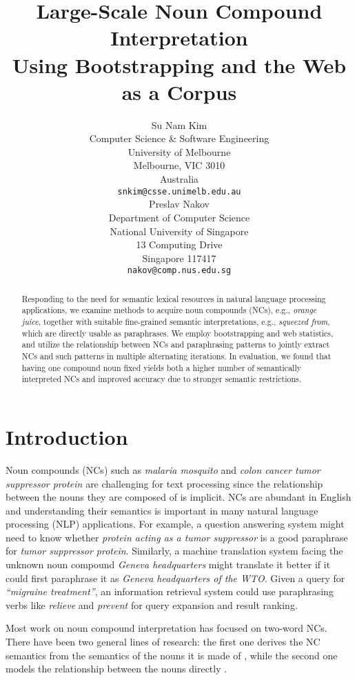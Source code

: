 \documentclass[letterpaper,11pt]{article}
\title{Large-Scale Noun Compound Interpretation \\
       Using Bootstrapping and the Web as a Corpus}
\author{Su Nam Kim \\
  Computer Science \& Software Engineering \\
  University of Melbourne\\
  Melbourne, VIC 3010\\
  Australia\\
  {\tt snkim@csse.unimelb.edu.au} \\\And
  Preslav Nakov\\
  Department of Computer Science\\
  National University of Singapore\\
  13 Computing Drive\\
  Singapore 117417\\
  {\tt nakov@comp.nus.edu.sg} \\}
\date{}
\begin{document}
\maketitle


\begin{abstract}

Responding  to the  need  for semantic  lexical  resources in  natural
language processing  applications, we examine methods  to acquire noun
compounds  (NCs), e.g.,  \emph{orange juice},  together with  suitable
fine-grained  semantic  interpretations, e.g.,  \emph{squeezed  from},
which  are directly  usable  as paraphrases.  We employ  bootstrapping
and  web statistics,  and  utilize the  relationship  between NCs  and
paraphrasing  patterns to  jointly extract  NCs and  such patterns  in
multiple alternating  iterations. In evaluation, we  found that having
one compound  noun fixed yields  both a higher number  of semantically
interpreted  NCs  and  improved  accuracy  due  to  stronger  semantic
restrictions.

\end{abstract}

\section{Introduction}
\label{sec:introduction}


Noun compounds (NCs) such as \emph{malaria mosquito} and \textit{colon
cancer tumor  suppressor protein} are challenging  for text processing
since  the relationship  between the  nouns  they are  composed of  is
implicit.
NCs are abundant in English and understanding their semantics is
important in many natural language processing (NLP) applications.
For example,  a question answering  system might need to  know whether
\emph{protein acting as  a tumor suppressor} is a  good paraphrase for
\emph{tumor  suppressor  protein}.  Similarly, a  machine  translation
system  facing the  unknown noun  compound \emph{Geneva  headquarters}
might  translate  it  better  if  it  could  first  paraphrase  it  as
\emph{Geneva headquarters of the WTO}.
Given  a  query for  \emph{``migraine  treatment''},  an
information  retrieval  system  could   use  paraphrasing  verbs  like
\emph{relieve}  and  \emph{prevent}  for query  expansion  and  result
ranking.

Most work on noun compound interpretation has focused on two-word NCs.
There have been two general lines of research:
the first one derives the NC semantics from the semantics of the nouns it is made of \cite{Rosario:2002,Moldovan:2004,Kim:2005,Girju:2007a,Oseaghdha:2009,Tratz:2010},
while the second one models the relationship between the nouns directly
\cite{Vanderwende:1994,Lapata:2002,Kim:2006,Nakov:2006:AIMSA,Nakov:2008,Butnariu:2008}.
\end{document}

